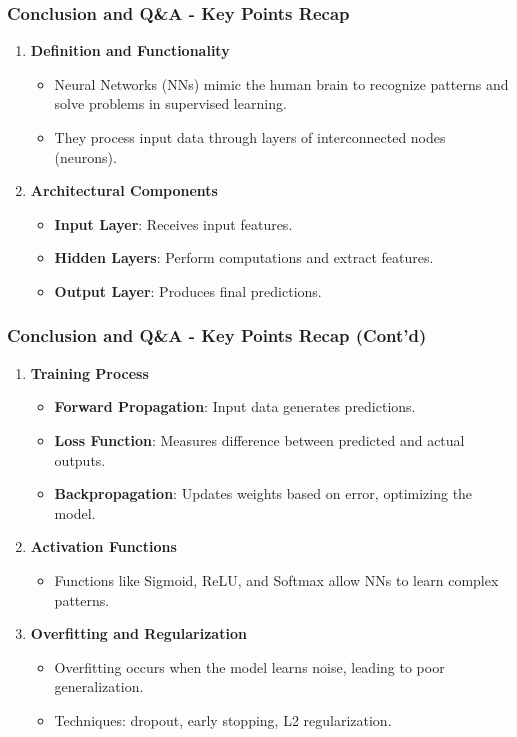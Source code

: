 \documentclass[aspectratio=169]{beamer}
\begin{document}
\begin{frame}[fragile]
    \frametitle{Conclusion and Q\&A - Key Points Recap}
    \begin{enumerate}
        \item \textbf{Definition and Functionality}
        \begin{itemize}
            \item Neural Networks (NNs) mimic the human brain to recognize patterns and solve problems in supervised learning.
            \item They process input data through layers of interconnected nodes (neurons).
        \end{itemize}

        \item \textbf{Architectural Components}
        \begin{itemize}
            \item \textbf{Input Layer}: Receives input features.
            \item \textbf{Hidden Layers}: Perform computations and extract features.
            \item \textbf{Output Layer}: Produces final predictions.
        \end{itemize}
    \end{enumerate}
\end{frame}

\begin{frame}[fragile]
    \frametitle{Conclusion and Q\&A - Key Points Recap (Cont'd)}
    \begin{enumerate}[resume]
        \item \textbf{Training Process}
        \begin{itemize}
            \item \textbf{Forward Propagation}: Input data generates predictions.
            \item \textbf{Loss Function}: Measures difference between predicted and actual outputs.
            \item \textbf{Backpropagation}: Updates weights based on error, optimizing the model.
        \end{itemize}

        \item \textbf{Activation Functions}
        \begin{itemize}
            \item Functions like Sigmoid, ReLU, and Softmax allow NNs to learn complex patterns.
        \end{itemize}

        \item \textbf{Overfitting and Regularization}
        \begin{itemize}
            \item Overfitting occurs when the model learns noise, leading to poor generalization.
            \item Techniques: dropout, early stopping, L2 regularization.
        \end{itemize}
    \end{enumerate}
\end{frame}
\end{document}
